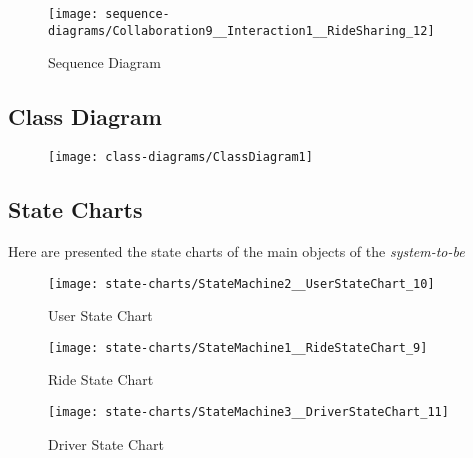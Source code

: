 \begin{figure}[h!t]
\caption{Sequence Diagram}
\texttt{[image: sequence-diagrams/Collaboration9\_\_Interaction1\_\_RideSharing\_12]}
\centering
\end{figure}

\newpage
\subsection{Class Diagram} 
\begin{figure}[h!t]
\texttt{[image: class-diagrams/ClassDiagram1]}
\centering
\end{figure}
\newpage

\subsection{State Charts} 
Here are presented the state charts of the main objects of the \emph{system-to-be}

\begin{figure}[h!]
\caption{User State Chart}
\texttt{[image: state-charts/StateMachine2\_\_UserStateChart\_10]}
\centering
\end{figure}

\newpage
\vfill
\begin{figure}
\caption{Ride State Chart}
\texttt{[image: state-charts/StateMachine1\_\_RideStateChart\_9]}
\centering
\end{figure}
\vfill
\clearpage


\newpage
\vfill
\begin{figure}
\caption{Driver State Chart}
\texttt{[image: state-charts/StateMachine3\_\_DriverStateChart\_11]}
\centering
\end{figure}
\vfill
\clearpage
